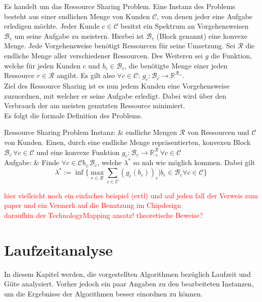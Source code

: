 \documentclass[11pt, a4paper, german]{article}
\newcommand{\TM}{TechnologyMapping }
\begin{document}
Es handelt um das Ressource Sharing Problem. Eine Instanz des Problems besteht aus einer endlichen Menge von Kunden $\mathcal{C}$, von denen jeder eine Aufgabe erledigen möchte.  Jeder Kunde $c \in \mathcal{C}$ besitzt ein Spektrum an Vorgehensweisen $\mathcal{B}_c$ um seine Aufgabe zu meistern. Hierbei ist $\mathcal{B}_c$ (Block genannt) eine konvexe Menge. Jede Vorgehensweise benötigt Ressourcen für seine Umsetzung. Sei $\mathcal{R}$ die endliche  Menge aller verschiedener Ressourcen.  Des Weiteren sei $g$ die Funktion, welche für jeden Kunden $c$ und $b_c \in \mathcal{B}_c$, die benötigte Menge einer jeden Ressource $r \in \mathcal{R}$ angibt. Es gilt also $\forall c \in \mathcal{C}: \, g_c:\mathcal{B}_c \rightarrow \mathbb{R}^{\mathcal{R}_+}$. \\
Ziel des Ressource Sharing ist es nun jedem Kunden eine Vorgehensweise zuzuordnen, mit welcher er seine Aufgabe erledigt. Dabei wird über den Verbrauch der am meisten genutzten Ressource minimiert. \\
Es folgt die formale Definition des Problems. \\
\begin{problem}[framed]{Ressource Sharing Problem}
  Instanz:  & endliche Mengen $\mathcal{R}$ von Ressourcen und $\mathcal{C}$ von Kunden. Einen, durch eine endliche Menge repräsentierten,  konvexen Block $\mathcal{B}_c \, \forall c \in \mathcal{C}$ und eine konvexe Funktion $g_c: \mathcal{B}_c \rightarrow \mathbb{R}^{\mathcal{R}}_+ \, \forall c \in \mathcal{C}$\\
  Aufgabe: & Finde $\forall c \in \mathcal{C} b_ \in \mathcal{B}_c$, welche $\lambda ^*$ so nah wie möglich kommen. Dabei gilt \[\lambda^* := \inf \{ \max\limits_{r \in \mathcal{R}} \sum\limits_{c \in \mathcal{C}}  (g_c(b_c))_r | b_c \in \mathcal{B}_c \forall c \in \mathcal{C} \}\]
\end{problem}
\textcolor{red}{hier vielleicht noch ein einfaches beispiel (evtl) und auf jeden fall der Verweis zum paper und ein Vermerk auf die Benutzung im Chipdesign \\ daraufhin der \TM ansatz! theoretische Beweise?}


\section{Laufzeitanalyse}
\label{sec:analyse}
In diesem Kapitel werden, die vorgestellten Algorithmen bezüglich Laufzeit und Güte analysiert. Vorher jedoch ein paar Angaben zu den bearbeiteten Instanzen, um die Ergebnisse der Algorithmen besser einordnen zu können.
\end{document}
